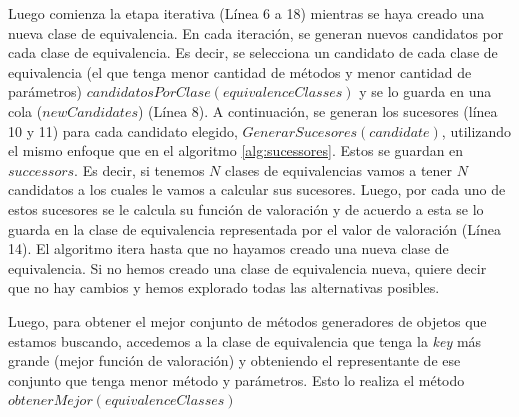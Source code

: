 Luego comienza la etapa iterativa (Línea 6 a 18) mientras se haya creado una nueva clase de equivalencia. En cada iteración, se generan nuevos candidatos por cada clase de equivalencia. Es decir, se selecciona un candidato de cada clase de equivalencia (el que tenga menor cantidad de métodos y menor cantidad de parámetros) $candidatosPorClase(equivalenceClasses)$ y se lo guarda en una cola ($newCandidates$) (Línea 8). A continuación, se generan los sucesores (línea 10 y 11) para cada candidato elegido, $GenerarSucesores(candidate)$, utilizando el mismo enfoque que en el algoritmo \ref{alg:sucessores}. Estos se guardan en $successors$. Es decir, si tenemos $N$ clases de equivalencias vamos a tener $N$ candidatos a los cuales le vamos a calcular sus sucesores.  Luego, por cada uno de estos sucesores se le calcula su función de valoración y de acuerdo a esta se lo guarda en la clase de equivalencia representada por el valor de valoración (Línea 14).
El algoritmo itera hasta que no hayamos creado una nueva clase de equivalencia. Si no hemos creado una clase de equivalencia nueva, quiere decir que no hay cambios y hemos explorado todas las alternativas posibles. 

Luego, para obtener el mejor conjunto de métodos generadores de objetos que estamos buscando, accedemos a la clase de equivalencia que tenga la \emph{key} más grande (mejor función de valoración) y obteniendo el representante de ese conjunto que tenga menor método y parámetros. Esto lo realiza el método $obtenerMejor(equivalenceClasses)$




